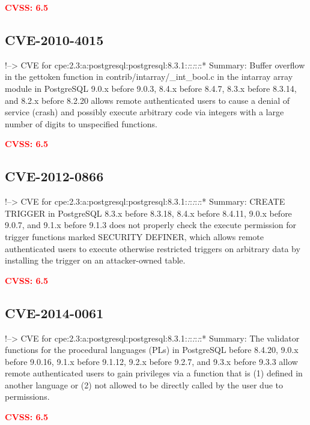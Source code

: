 \documentclass[a4paper, 12pt]{article}
\begin{document}
\textbf{\textcolor{red}{CVSS: 6.5}}

\hypertarget{cve-2010-4015}{%
\subsection{CVE-2010-4015}\label{cve-2010-4015}}

!--\textgreater{} CVE for
cpe:2.3:a:postgresql:postgresql:8.3.1:\emph{:}:\emph{:}:\emph{:}:*
Summary: Buffer overflow in the gettoken function in
contrib/intarray/\_int\_bool.c in the intarray array module in
PostgreSQL 9.0.x before 9.0.3, 8.4.x before 8.4.7, 8.3.x before 8.3.14,
and 8.2.x before 8.2.20 allows remote authenticated users to cause a
denial of service (crash) and possibly execute arbitrary code via
integers with a large number of digits to unspecified functions.

\textbf{\textcolor{red}{CVSS: 6.5}}

\hypertarget{cve-2012-0866}{%
\subsection{CVE-2012-0866}\label{cve-2012-0866}}

!--\textgreater{} CVE for
cpe:2.3:a:postgresql:postgresql:8.3.1:\emph{:}:\emph{:}:\emph{:}:*
Summary: CREATE TRIGGER in PostgreSQL 8.3.x before 8.3.18, 8.4.x before
8.4.11, 9.0.x before 9.0.7, and 9.1.x before 9.1.3 does not properly
check the execute permission for trigger functions marked SECURITY
DEFINER, which allows remote authenticated users to execute otherwise
restricted triggers on arbitrary data by installing the trigger on an
attacker-owned table.

\textbf{\textcolor{red}{CVSS: 6.5}}

\hypertarget{cve-2014-0061}{%
\subsection{CVE-2014-0061}\label{cve-2014-0061}}

!--\textgreater{} CVE for
cpe:2.3:a:postgresql:postgresql:8.3.1:\emph{:}:\emph{:}:\emph{:}:*
Summary: The validator functions for the procedural languages (PLs) in
PostgreSQL before 8.4.20, 9.0.x before 9.0.16, 9.1.x before 9.1.12,
9.2.x before 9.2.7, and 9.3.x before 9.3.3 allow remote authenticated
users to gain privileges via a function that is (1) defined in another
language or (2) not allowed to be directly called by the user due to
permissions.

\textbf{\textcolor{red}{CVSS: 6.5}}
\end{document}
